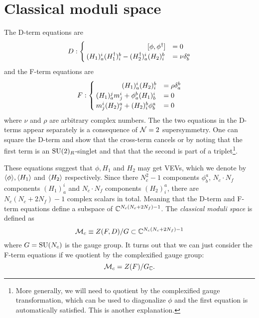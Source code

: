 \section{Classical moduli space}

    The D-term equations are
    \begin{align}
        D:
        \begin{cases}
            \hspace{3.1cm}[\phi,\phi^\dagger]  &= 0 \\
            (H_1)^i_a(H^\dagger_1)^b_i-(H^\dagger_2)^i_a(H_2)^b_i &= \nu\delta^a_b
        \end{cases}
    \end{align}
    and the F-term equations are
    \begin{align}
        F:
        \begin{cases}
            \hspace{1.3cm}(H_1)^i_a(H_2)^b_i &= \rho\delta^b_a \\
            (H_1)^j_am^i_j+\phi^b_a(H_1)^i_b &= 0 \\
            m^i_j(H_2)^a_j+(H_2)^b_i\phi^a_b &= 0
        \end{cases}
    \end{align}
    where $\nu$ and $\rho$ are arbitrary complex numbers. The the two equations in the D-terms appear separately is a consequence of $\mathcal{N}=2$ supersymmetry. One can square the D-term and show that the cross-term cancels or by noting that the first term is an $\text{SU}(2)_R$-singlet and that that the second is part of a triplet\footnote{More generally, we will need to quotient by the complexified gauge transformation, which can be used to diagonalize $\phi$ and the first equation is automatically satisfied. This is another explanation.}.
    
    These equations suggest that $\phi,H_1$ and $H_2$ may get VEVs, which we denote by $\langle\phi\rangle,\langle H_1\rangle$ and $\langle H_2\rangle$ respectively. Since there $N^2_c-1$ components $\phi^a_b$, $N_c\cdot N_f$ components $(H_1)^i_a$ and $N_c\cdot N_f$ components $(H_2)^a_i$, there are $N_c(N_c+2N_f)-1$ complex scalars in total. Meaning that the D-term and F-term equations define a subspace of $\mathbb{C}^{N_c(N_c+2N_f)-1}$. The \emph{classical moduli space} is defined as
    \begin{equation}
        \mathcal{M}_c\equiv Z(F,D)/G\subset \mathbb{C}^{N_c(N_c+2N_f)-1}
    \end{equation}
    where $G=\text{SU}(N_c)$ is the gauge group. It turns out that we can just consider the F-term equations if we quotient by the complexified gauge group:
    \begin{equation}
        \mathcal{M}_c = Z(F)/G_{\mathbb{C}}.
    \end{equation}

